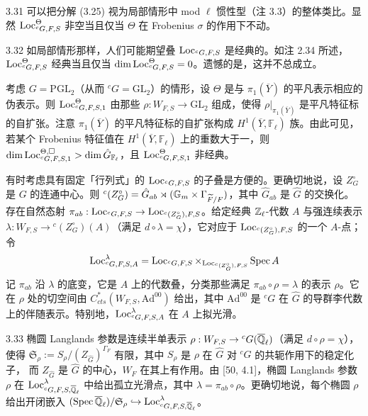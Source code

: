\begin{rem}{3.31}
可以把分解 (3.25) 视为局部情形中 mod $\ell$ 惯性型（注 3.3）的整体类比。显然 $\operatorname{Loc}^{\Theta}_{{}^{c}G,F,S}$ 非空当且仅当 $\Theta$ 在 Frobenius $\sigma$ 的作用下不动。
\end{rem}

\begin{rem}{3.32}
如局部情形那样，人们可能期望叠 $\operatorname{Loc}_{{}^{c}G,F,S}$ 是经典的。如注 2.34 所述，$\operatorname{Loc}^{\Theta}_{{}^{c}G,F,S}$ 经典当且仅当 $\dim\operatorname{Loc}^{\Theta}_{{}^{c}G,F,S}=0$。遗憾的是，这并不总成立。

考虑 $G=\mathrm{PGL}_2$（从而 ${}^cG=\mathrm{GL}_2$）的情形，设 $\Theta$ 是与 $\pi_1(\overline Y)$ 的平凡表示相应的伪表示。则 $\operatorname{Loc}^{\Theta}_{{}^{c}G,F,S,1}$ 由那些 $\rho:W_{F,S}\to\mathrm{GL}_2$ 组成，使得 $\rho|_{\pi_1(\overline Y)}$ 是平凡特征标的自扩张。注意 $\pi_1(\overline Y)$ 的平凡特征标的自扩张构成 $H^{1}(\overline Y,\mathbb F_{\ell})$ 族。由此可见，若某个 Frobenius 特征值在 $H^{1}(\overline Y,\mathbb F_{\ell})$ 上的重数大于一，则 $\dim\operatorname{Loc}^{\Theta,\square}_{{}^{c}G,F,S,1}>\dim\hat G_{\mathbb F_{\ell}}$，且 $\operatorname{Loc}^{\Theta}_{{}^{c}G,F,S,1}$ 非经典。
\end{rem}

有时考虑具有固定「行列式」的 $\operatorname{Loc}_{{}^{c}G,F,S}$ 的子叠是方便的。更确切地说，设 $Z^{\circ}_G$ 是 $G$ 的连通中心。则 ${}^c(Z^{\circ}_G)=\hat G_{ab}\rtimes(\mathbb G_m\times\Gamma_{\widetilde F/F})$，其中 $\hat G_{ab}$ 是 $\hat G$ 的交换化。存在自然态射 $\pi_{ab}:\operatorname{Loc}_{{}^{c}G,F,S}\to\operatorname{Loc}_{{}^{c}(Z^{\circ}_G),F,S}$。给定经典 $\mathbb{Z}_{\ell}$-代数 $A$ 与强连续表示 $\lambda:W_{F,S}\to{}^c(Z^{\circ}_G)(A)$（满足 $d\circ\lambda=\chi$），它对应于 $\operatorname{Loc}_{{}^{c}(Z^{\circ}_G),F,S}$ 的一个 $A$-点；令
\[
\operatorname{Loc}^{\lambda}_{{}^{c}G,F,S,A}=\operatorname{Loc}_{{}^{c}G,F,S}\times_{\operatorname{Loc}_{{}^{c}(Z^{\circ}_G),F,S}}\operatorname{Spec} A
\]
记 $\pi_{ab}$ 沿 $\lambda$ 的底变，它是 $A$ 上的代数叠，分类那些满足 $\pi_{ab}\circ\rho=\lambda$ 的表示 $\rho$。它在 $\rho$ 处的切空间由 $C^{*}_{cts}(W_{F,S},\mathrm{Ad}^{00})$ 给出，其中 $\mathrm{Ad}^{00}$ 是 ${}^cG$ 在 $\hat G$ 的导群李代数上的伴随表示。特别地，$\operatorname{Loc}^{\lambda}_{{}^{c}G,F,S,A}$ 在 $A$ 上拟光滑。
\begin{exam}{3.33}
椭圆 Langlands 参数是连续半单表示 $\rho:W_{F,S}\to{}^cG(\overline{\mathbb{Q}}_{\ell})$（满足 $d\circ\rho=\chi$），使得 $\mathfrak S_{\rho}:=S_{\rho}/(Z_{\hat G})^{\Gamma_F}$ 有限，其中 $S_{\rho}$ 是 $\rho$ 在 $\hat G$ 对 ${}^cG$ 的共轭作用下的稳定化子，
而 $Z_{\hat G}$ 是 $\hat G$ 的中心，$W_F$ 在其上有作用。由 [50, 4.1]，椭圆 Langlands 参数 $\rho$ 在 $\operatorname{Loc}^{\lambda}_{{}^{c}G,F,S,\overline{\mathbb{Q}}_{\ell}}$ 中给出孤立光滑点，其中 $\lambda=\pi_{ab}\circ\rho$。更确切地说，每个椭圆 $\rho$ 给出开闭嵌入 $(\operatorname{Spec}\overline{\mathbb{Q}}_{\ell})/\mathfrak S_{\rho}\hookrightarrow\operatorname{Loc}^{\lambda}_{{}^{c}G,F,S,\overline{\mathbb{Q}}_{\ell}}$。
\end{exam}

